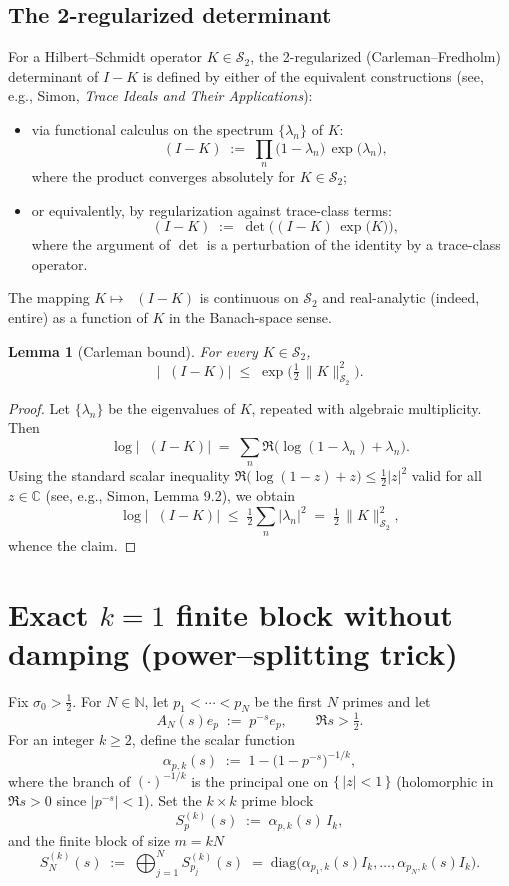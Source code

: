 \documentclass[11pt]{article}
\newtheorem{lemma}[theorem]{Lemma}
\theoremstyle{remark}
\newcommand{\C}{\mathbb{C}}
\newcommand{\HS}{\mathcal{S}_2}
\DeclareMathOperator{\dettwo}{det_2}
\begin{document}
\subsection{The 2-regularized determinant \(\dettwo\)}
For a Hilbert--Schmidt operator \(K\in\HS\), the 2-regularized (Carleman--Fredholm) determinant of \(I-K\) is defined by either of the equivalent constructions (see, e.g., Simon, \emph{Trace Ideals and Their Applications}):
\begin{itemize}
 \item via functional calculus on the spectrum \(\{\lambda_n\}\) of \(K\):
 \[
  \dettwo(I-K)\;:=\;\prod_{n}\big(1-\lambda_n\big)\,\exp\!\big(\lambda_n\big),
 \]
 where the product converges absolutely for \(K\in\HS\);
 \item or equivalently, by regularization against trace-class terms:
 \[
  \dettwo(I-K)\;:=\;\det\!\Big((I-K)\,\exp\big(K\big)\Big),
 \]
 where the argument of \(\det\) is a perturbation of the identity by a trace-class operator.
\end{itemize}
The mapping \(K\mapsto \dettwo(I-K)\) is continuous on \(\HS\) and real-analytic (indeed, entire) as a function of \(K\) in the Banach-space sense.

\begin{lemma}[Carleman bound]\label{lem:carleman}
For every \(K\in\HS\),
\[
 \big|\dettwo(I-K)\big|\;\le\; \exp\!\Big(\tfrac12\,\|K\|_{\HS}^2\Big).
\]
\end{lemma}
\begin{proof}
Let \(\{\lambda_n\}\) be the eigenvalues of \(K\), repeated with algebraic multiplicity. Then
\[
 \log\big|\dettwo(I-K)\big|\;=\; \sum_n \Re\Big(\log(1-\lambda_n)+\lambda_n\Big).
\]
Using the standard scalar inequality \(\Re\big(\log(1-z)+z\big)\le \tfrac12 |z|^2\) valid for all \(z\in\C\) (see, e.g., Simon, Lemma 9.2), we obtain
\[
 \log\big|\dettwo(I-K)\big|\;\le\; \tfrac12\sum_n |\lambda_n|^2\;=\;\tfrac12\,\|K\|_{\HS}^2,
\]
whence the claim.
\end{proof}

\section*{Exact $k=1$ finite block without damping (power--splitting trick)}

Fix $\sigma_0>\tfrac12$. For $N\in\mathbb N$, let $p_1<\cdots<p_N$ be the first $N$ primes and let
\[
 A_N(s)e_p\;:=\;p^{-s}e_p,\qquad \Re s>\tfrac12.
\]
For an integer $k\ge 2$, define the scalar function
\[
 \alpha_{p,k}(s)\;:=\;1-\bigl(1-p^{-s}\bigr)^{-1/k},
\]
where the branch of $(\cdot)^{-1/k}$ is the principal one on $\{\,|z|<1\,\}$ (holomorphic in $\Re s>0$ since $|p^{-s}|<1$). Set the $k\times k$ prime block
\[
 S_p^{(k)}(s)\;:=\;\alpha_{p,k}(s)\,I_k,
\]
and the finite block of size $m=kN$
\[
 \boxed{\quad S_{N}^{(k)}(s)\;:=\;\bigoplus_{j=1}^{N} S_{p_j}^{(k)}(s)\;=\;\mathrm{diag}\bigl(\alpha_{p_1,k}(s)I_k,\dots,\alpha_{p_N,k}(s)I_k\bigr).\quad}
\]
\end{document}
